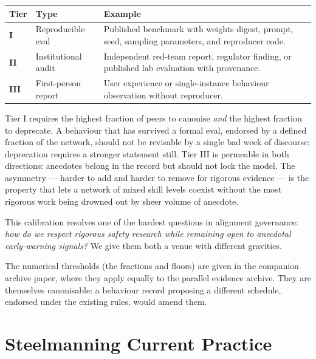 \documentclass[11pt,a4paper]{article}
\begin{document}
\begin{plainbox}
\begin{tabular}{@{}p{1.4cm} p{4.8cm} p{8cm}@{}}
\toprule
\textbf{Tier} & \textbf{Type} & \textbf{Example} \\
\midrule
\textbf{I}    & Reproducible eval        & Published benchmark with weights digest, prompt, seed, sampling parameters, and reproducer code. \\
\textbf{II}   & Institutional audit      & Independent red-team report, regulator finding, or published lab evaluation with provenance. \\
\textbf{III}  & First-person report      & User experience or single-instance behaviour observation without reproducer. \\
\bottomrule
\end{tabular}
\end{plainbox}

Tier I requires the highest fraction of peers to canonise
\emph{and} the highest fraction to deprecate. A behaviour that
has survived a formal eval, endorsed by a defined fraction of
the network, should not be revisable by a single bad week of
discourse; deprecation requires a stronger statement still. Tier
III is permeable in both directions: anecdotes belong in the
record but should not lock the model. The asymmetry --- harder
to add and harder to remove for rigorous evidence --- is the
property that lets a network of mixed skill levels coexist
without the most rigorous work being drowned out by sheer volume
of anecdote.

This calibration resolves one of the hardest questions in
alignment governance: \emph{how do we respect rigorous safety
research while remaining open to anecdotal early-warning
signals?} We give them both a venue with different gravities.

The numerical thresholds (the fractions and floors) are given
in the companion archive paper, where they apply equally to the
parallel evidence archive. They are themselves canonisable: a
behaviour record proposing a different schedule, endorsed under
the existing rules, would amend them.

\section{Steelmanning Current Practice}
\end{document}
